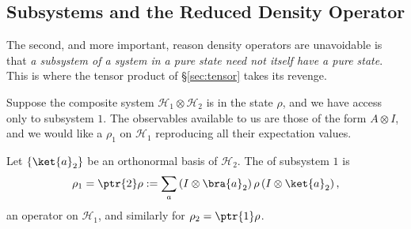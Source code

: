 \begin{center}
\end{center}

\subsection{Subsystems and the Reduced Density Operator}

The second, and more important, reason density operators are unavoidable is that \emph{a subsystem of a system in a pure state need not itself have a pure state}. This is where the tensor product of \S\ref{sec:tensor} takes its revenge.

Suppose the composite system $\mathcal{H}_1\otimes\mathcal{H}_2$ is in the state $\rho$, and we have access only to subsystem $1$. The observables available to us are those of the form $A \otimes I$, and we would like a $\rho_1$ on $\mathcal{H}_1$ reproducing all their expectation values.

\begin{definition}
    Let $\{\ket{a}_2\}$ be an orthonormal basis of $\mathcal{H}_2$. The  of subsystem $1$ is
    $$
    \rho_1 = \ptr{2}\rho := \sum_a \left( I \otimes \bra{a}_2 \right)\rho\left( I \otimes \ket{a}_2 \right),
    $$
    an operator on $\mathcal{H}_1$, and similarly for $\rho_2 = \ptr{1}\rho$.
\end{definition}

